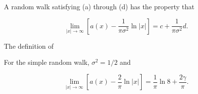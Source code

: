 A random walk satisfying (a) through (d) has the property that

$$\lim_{|x| \to \infty} \left[ a(x) - \frac{1}{\pi\sigma^2} \ln |x| \right] = c + \frac{1}{\pi\sigma^2} d.$$

The definition of

For the simple random walk, $\sigma^2 = 1/2$ and

$$\lim_{|x| \to \infty} \left[ a(x) - \frac{2}{\pi} \ln |x| \right] = \frac{1}{\pi} \ln 8 + \frac{2\gamma}{\pi}.$$